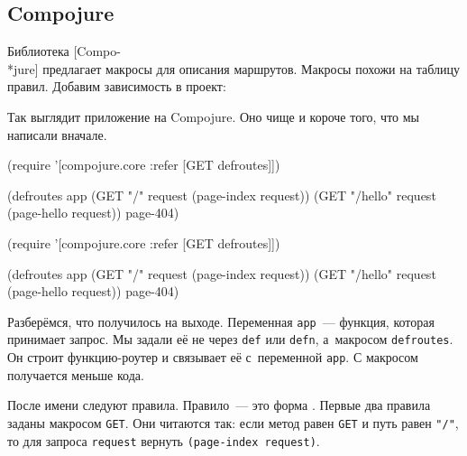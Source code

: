 \subsection{Compojure}

\label{compojure}


Библиотека [Compo-\\*jure]
предлагает макросы для описания маршрутов. Макросы похожи на таблицу правил.
Добавим зависимость в проект:

\begin{english}
  \begin{clojure}
[compojure "1.6.1"]
  \end{clojure}
\end{english}

Так выглядит приложение на Compojure. Оно чище и короче того, что мы написали
вначале.

\ifx\DEVICETYPE\MOBILE

\begin{english}
  \begin{clojure}
(require '[compojure.core
           :refer [GET defroutes]])

(defroutes app
  (GET "/" request
    (page-index request))
  (GET "/hello" request
    (page-hello request))
  page-404)
  \end{clojure}
\end{english}

\else

\begin{english}
  \begin{clojure}
(require '[compojure.core :refer [GET defroutes]])

(defroutes app
  (GET "/"      request (page-index request))
  (GET "/hello" request (page-hello request))
  page-404)
  \end{clojure}
\end{english}

\fi

Разберёмся, что получилось на выходе. Переменная \verb|app|~--- функция, которая
принимает запрос. Мы задали её не через \verb|def| или \verb|defn|, а~макросом
\verb|defroutes|. Он строит функцию-роутер и связывает её с~переменной
\verb|app|. С макросом получается меньше кода.

После имени следуют правила. Правило~--- это форма .
Первые два правила заданы макросом \verb|GET|. Они читаются так:
если метод равен \verb|GET| и путь равен \verb|"/"|, то для запроса
\verb|request| вернуть \verb|(page-index request)|.

